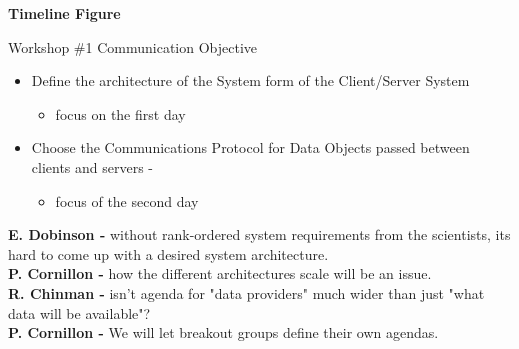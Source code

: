 \begin{center}
 {\bf Timeline Figure}
\end{center}
\bigskip
\noindent Workshop \#1 Communication Objective 
\begin{itemize}
	\item Define the architecture of the System form of the Client/Server 
System
    	   \begin{itemize}
		\item focus on the first day
    	   \end{itemize}

	\item Choose the Communications Protocol for Data Objects passed 
between clients and servers - 
    	   \begin{itemize}
		\item focus of the second day 
    	   \end{itemize}
\end{itemize}
\smallskip
{\bf E. Dobinson -} without rank-ordered system requirements from the 
scientists, its hard to come up with a desired system architecture.\\
{\bf P. Cornillon -} how the different architectures scale will be an issue.\\
{\bf R. Chinman -} isn't agenda for "data providers" much wider than just
"what data will be available"?\\
{\bf P. Cornillon -} We will let breakout groups define their own agendas.

\bigskip
{}

